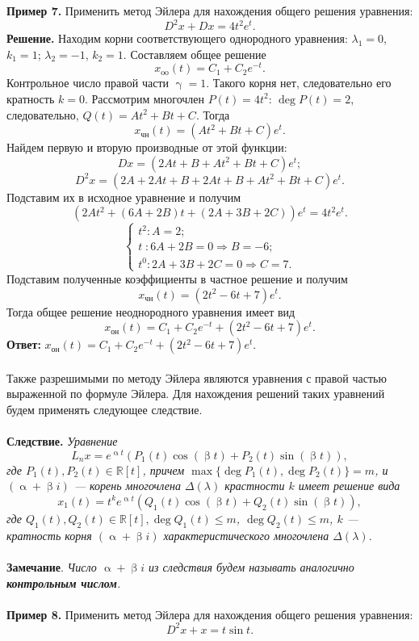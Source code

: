 \documentclass[a4paper, 12pt]{article}
\newcommand{\Rm}{\mathbb{R}}
\renewcommand{\alpha}{\upalpha}
\renewcommand{\beta}{\upbeta}
\begin{document}
	\textbf{Пример 7.} Применить метод Эйлера для нахождения общего решения уравнения: $$D^2x + Dx = 4t^2e^t.$$
	\textbf{Решение.} Находим корни соответствующего однородного уравнения: $\lambda_1 = 0$, $k_1 = 1$; $\lambda_2 = -1$, $k_2 = 1$. Составляем общее решение $$x_\text{oo}(t) = C_1 + C_2e^{-t}.$$
	Контрольное число правой части $\upgamma = 1$. Такого корня нет, следовательно его кратность $k = 0$. Рассмотрим многочлен $P(t) = 4t^2$: $\deg P(t) = 2$, следовательно, $Q(t) = At^2 + Bt + C$.
	Тогда $$x_\text{чн} (t)= (At^2 + Bt + C)e^t.$$
	Найдем первую и вторую производные от этой функции:
	$$Dx = (2At + B + At^2 + Bt + C)e^t;$$
	$$D^2x = (2A + 2At + B + 2At + B + At^2 + Bt + C)e^t.$$
	Подставим их в исходное уравнение и получим $$(2At^2 + (6A + 2B)t + (2A + 3B + 2C))e^t = 4t^2 e^t.$$
	 $$\begin{cases}
		t^2 : A = 2;\\
		t\; : 6A+2B = 0 \Rightarrow B = -6;\\
		t^0 : 2A + 3B + 2C = 0 \Rightarrow C = 7.
	\end{cases}$$
Подставим полученные коэффициенты в частное решение и получим $$x_\text{чн} (t)= (2t^2 - 6t + 7)e^t.$$
Тогда общее решение неоднородного уравнения имеет вид $$x_\text{он}(t) =C_1 + C_2e^{-t} +(2t^2 - 6t + 7)e^t.$$
\textbf{Ответ:} $x_\text{он}(t) =C_1 + C_2e^{-t} +(2t^2 - 6t + 7)e^t.$\\\\
Также разрешимыми по методу Эйлера являются уравнения с правой частью выраженной по формуле Эйлера. Для нахождения решений таких уравнений будем применять следующее следствие.\\\\
\textbf{Следствие.}
	\textit{Уравнение $$L_nx = e^{\alpha t}(P_1(t)\cos(\beta t) + P_2(t)\sin (\beta t)),$$ где $P_1(t),P_2(t)\in \Rm[t]$, причем $\max\{\deg P_1(t), \deg P_2(t)\} = m$, и $(\alpha + \beta i)$ --- корень многочлена $\Delta (\lambda)$ крастности $k$ имеет решение вида $$x_1(t) = t^ke^{\alpha t}(Q_1(t)\cos(\beta t) + Q_2(t)\sin(\beta t)),$$ где $Q_1(t), Q_2(t) \in \Rm[t], \deg Q_1(t) \leqslant m$, $\deg Q_2(t) \leqslant m$, $k$ --- кратность корня $(\alpha + \beta i)$ характеристического многочлена $\Delta(\lambda)$.}\\\\
	\textbf{Замечание}. \textit{Число $\alpha + \beta i$ из следствия будем называть аналогично \textbf{контрольным числом}.}\\\\
\textbf{Пример 8.} Применить метод Эйлера для нахождения общего решения уравнения: $$D^2x + x = t\sin t.$$
\end{document}
